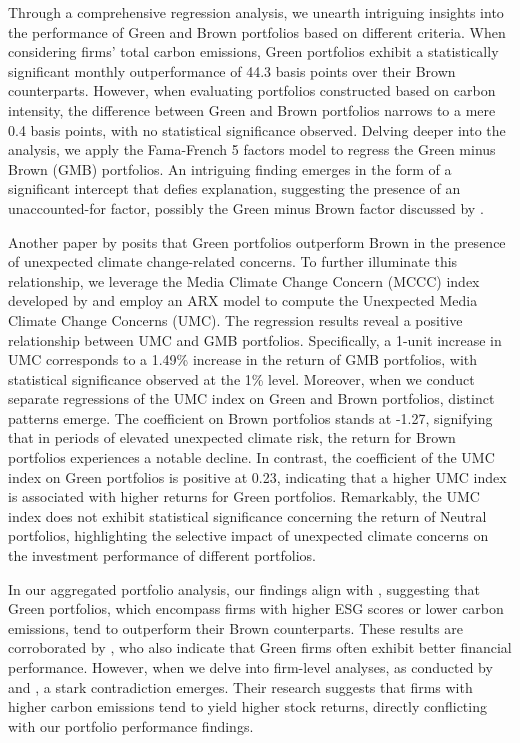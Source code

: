 \documentclass[12pt]{article}
\begin{document}
Through a comprehensive regression analysis, we unearth intriguing insights into the performance of Green and Brown portfolios based on different criteria. When considering firms' total carbon emissions, Green portfolios exhibit a statistically significant monthly outperformance of 44.3 basis points over their Brown counterparts. However, when evaluating portfolios constructed based on carbon intensity, the difference between Green and Brown portfolios narrows to a mere 0.4 basis points, with no statistical significance observed. Delving deeper into the analysis, we apply the Fama-French 5 factors model to regress the Green minus Brown (GMB) portfolios. An intriguing finding emerges in the form of a significant intercept that defies explanation, suggesting the presence of an unaccounted-for factor, possibly the Green minus Brown factor discussed by \cite{pastor2022dissecting}. 

Another paper by \cite{pastor2021sustainable} posits that Green portfolios outperform Brown in the presence of unexpected climate change-related concerns. To further illuminate this relationship, we leverage the Media Climate Change Concern (MCCC) index developed by \cite{ardia2022climate} and employ an ARX model to compute the Unexpected Media Climate Change Concerns (UMC). The regression results reveal a positive relationship between UMC and GMB portfolios. Specifically, a 1-unit increase in UMC corresponds to a 1.49\% increase in the return of GMB portfolios, with statistical significance observed at the 1\% level. Moreover, when we conduct separate regressions of the UMC index on Green and Brown portfolios, distinct patterns emerge. The coefficient on Brown portfolios stands at -1.27, signifying that in periods of elevated unexpected climate risk, the return for Brown portfolios experiences a notable decline. In contrast, the coefficient of the UMC index on Green portfolios is positive at 0.23, indicating that a higher UMC index is associated with higher returns for Green portfolios. Remarkably, the UMC index does not exhibit statistical significance concerning the return of Neutral portfolios, highlighting the selective impact of unexpected climate concerns on the investment performance of different portfolios.

In our aggregated portfolio analysis, our findings align with \cite{pastor2022dissecting}, suggesting that Green portfolios, which encompass firms with higher ESG scores or lower carbon emissions, tend to outperform their Brown counterparts. These results are corroborated by \cite{friede2015esg}, who also indicate that Green firms often exhibit better financial performance. However, when we delve into firm-level analyses, as conducted by \cite{bolton2021investors} and \cite{aswani2023carbon}, a stark contradiction emerges. Their research suggests that firms with higher carbon emissions tend to yield higher stock returns, directly conflicting with our portfolio performance findings.
\end{document}
